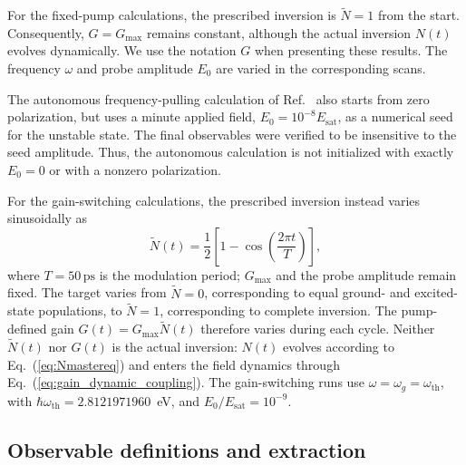 \documentclass{optica-article}
\begin{document}
For the fixed-pump calculations, the prescribed inversion is $\widetilde N=1$ from the start. Consequently, $G=G_{\max}$ remains constant, although the actual inversion $N(t)$ evolves dynamically. We use the notation $G$ when presenting these results. The frequency $\omega$ and probe amplitude $E_0$ are varied in the corresponding scans.

The autonomous frequency-pulling calculation of Ref.~\cite{Aradian:2024} also starts from zero polarization, but uses a minute applied field, $E_0=10^{-8}E_{\mathrm{sat}}$, as a numerical seed for the unstable state. The final observables were verified to be insensitive to the seed amplitude. Thus, the autonomous calculation is not initialized with exactly $E_0=0$ or with a nonzero polarization.

For the gain-switching calculations, the prescribed inversion instead varies sinusoidally as
\begin{equation}
\widetilde N(t) = \frac{1}{2}\!\left[1-\cos\!\left(\frac{2\pi t}{T}\right)\right],
\label{eq:Ntilde}
\end{equation}
where $T=50\,\mathrm{ps}$ is the modulation period; $G_{\max}$ and the probe amplitude remain fixed. The target varies from $\widetilde N=0$, corresponding to equal ground- and excited-state populations, to $\widetilde N=1$, corresponding to complete inversion. The pump-defined gain $G(t)=G_{\max}\widetilde N(t)$ therefore varies during each cycle. Neither $\widetilde N(t)$ nor $G(t)$ is the actual inversion: $N(t)$ evolves according to Eq.~(\ref{eq:Nmastereq}) and enters the field dynamics through Eq.~(\ref{eq:gain_dynamic_coupling}). The gain-switching runs use $\omega=\omega_g=\omega_{\mathrm{th}}$, with $\hbar\omega_{\mathrm{th}}=2.8121971960$~eV, and $E_0/E_{\mathrm{sat}}=10^{-9}$.


\subsection{Observable definitions and extraction}
\label{sec:observables}
\end{document}
